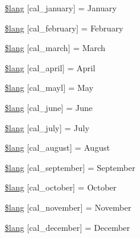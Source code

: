 \begin{DoxyCompactItemize}
\mbox{\hyperlink{calendar__lang_8php_a29fc67e0e18ded383ccb2fae4ed9500f}{\$lang}} \mbox{[}\textquotesingle{}cal\+\_\+january\textquotesingle{}\mbox{]} = \textquotesingle{}January\textquotesingle{}
\item 
\mbox{\hyperlink{calendar__lang_8php_afb865de49d3f598768ff91c4e6b1ad5e}{\$lang}} \mbox{[}\textquotesingle{}cal\+\_\+february\textquotesingle{}\mbox{]} = \textquotesingle{}February\textquotesingle{}
\item 
\mbox{\hyperlink{calendar__lang_8php_a67f59c410524d42bd0fd14fcc88a405d}{\$lang}} \mbox{[}\textquotesingle{}cal\+\_\+march\textquotesingle{}\mbox{]} = \textquotesingle{}March\textquotesingle{}
\item 
\mbox{\hyperlink{calendar__lang_8php_ae29241079b87997b56d455d06030fd86}{\$lang}} \mbox{[}\textquotesingle{}cal\+\_\+april\textquotesingle{}\mbox{]} = \textquotesingle{}April\textquotesingle{}
\item 
\mbox{\hyperlink{calendar__lang_8php_a55e9ba5a58cdf3e35a438cf34e8763fe}{\$lang}} \mbox{[}\textquotesingle{}cal\+\_\+mayl\textquotesingle{}\mbox{]} = \textquotesingle{}May\textquotesingle{}
\item 
\mbox{\hyperlink{calendar__lang_8php_a3f6453229450334d8382aeea241b59e8}{\$lang}} \mbox{[}\textquotesingle{}cal\+\_\+june\textquotesingle{}\mbox{]} = \textquotesingle{}June\textquotesingle{}
\item 
\mbox{\hyperlink{calendar__lang_8php_a0c0b25847c1eff06d6e70af1c1044cb8}{\$lang}} \mbox{[}\textquotesingle{}cal\+\_\+july\textquotesingle{}\mbox{]} = \textquotesingle{}July\textquotesingle{}
\item 
\mbox{\hyperlink{calendar__lang_8php_af3ec7453436342a22dc6ccc5f9362ee2}{\$lang}} \mbox{[}\textquotesingle{}cal\+\_\+august\textquotesingle{}\mbox{]} = \textquotesingle{}August\textquotesingle{}
\item 
\mbox{\hyperlink{calendar__lang_8php_aa82808fa4935db41b5ee6113311eb49e}{\$lang}} \mbox{[}\textquotesingle{}cal\+\_\+september\textquotesingle{}\mbox{]} = \textquotesingle{}September\textquotesingle{}
\item 
\mbox{\hyperlink{calendar__lang_8php_a0955be4cd71fdbc61cafb4fec3dba209}{\$lang}} \mbox{[}\textquotesingle{}cal\+\_\+october\textquotesingle{}\mbox{]} = \textquotesingle{}October\textquotesingle{}
\item 
\mbox{\hyperlink{calendar__lang_8php_a6b790e429102e42a4f44cfa3f3752b30}{\$lang}} \mbox{[}\textquotesingle{}cal\+\_\+november\textquotesingle{}\mbox{]} = \textquotesingle{}November\textquotesingle{}
\item 
\mbox{\hyperlink{calendar__lang_8php_a762006d627200bc070c299a5bbee2442}{\$lang}} \mbox{[}\textquotesingle{}cal\+\_\+december\textquotesingle{}\mbox{]} = \textquotesingle{}December\textquotesingle{}
\end{DoxyCompactItemize}



